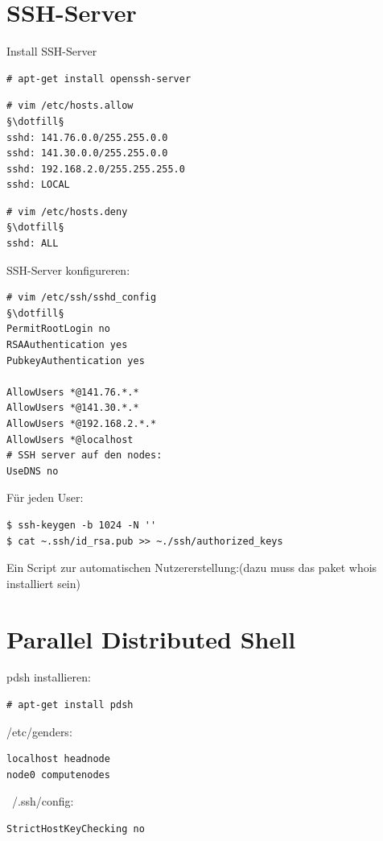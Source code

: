 \section{SSH-Server}
Install SSH-Server
\begin{lstlisting}[style=Bash]
# apt-get install openssh-server 
\end{lstlisting}
\begin{lstlisting}[style=Bash]
# vim /etc/hosts.allow
§\dotfill§
sshd: 141.76.0.0/255.255.0.0
sshd: 141.30.0.0/255.255.0.0
sshd: 192.168.2.0/255.255.255.0
sshd: LOCAL 
\end{lstlisting}
\begin{lstlisting}[style=Bash]
# vim /etc/hosts.deny
§\dotfill§
sshd: ALL
\end{lstlisting}

SSH-Server konfigureren:
\begin{lstlisting}[style=Bash]
# vim /etc/ssh/sshd_config
§\dotfill§
PermitRootLogin no
RSAAuthentication yes
PubkeyAuthentication yes

AllowUsers *@141.76.*.*
AllowUsers *@141.30.*.*
AllowUsers *@192.168.2.*.*
AllowUsers *@localhost
# SSH server auf den nodes:
UseDNS no
\end{lstlisting}
Für jeden User:
\begin{lstlisting}[style=Bash]
$ ssh-keygen -b 1024 -N ''
$ cat ~.ssh/id_rsa.pub >> ~./ssh/authorized_keys
\end{lstlisting}
Ein Script zur automatischen Nutzererstellung:(dazu muss das paket whois installiert sein)

\section{Parallel Distributed Shell}
pdsh installieren:
\begin{lstlisting}[style=Bash]
# apt-get install pdsh
\end{lstlisting}
/etc/genders:
\begin{lstlisting}[style=Bash]
localhost headnode
node0 computenodes
\end{lstlisting}
~/.ssh/config:
\begin{lstlisting}[style=Bash]
StrictHostKeyChecking no
\end{lstlisting}

